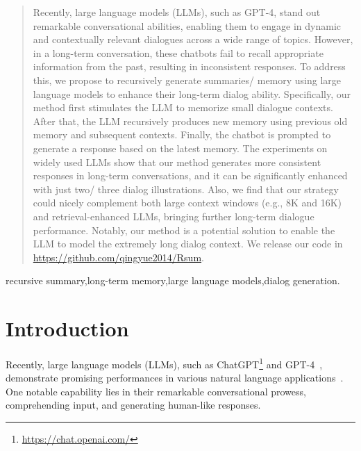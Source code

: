 \documentclass[authoryear,preprint,review,12pt]{elsarticle}
\begin{document}
\begin{frontmatter}
\begin{abstract}
Recently, large language models (LLMs), such as GPT-4, stand out remarkable conversational abilities, enabling them to engage in dynamic and contextually relevant dialogues across a wide range of topics. However, in a long-term conversation, these chatbots fail to recall appropriate information from the past, resulting in inconsistent responses. To address this, we propose to recursively generate summaries/ memory using large language models to enhance their long-term dialog ability. Specifically, our method first stimulates the LLM to memorize small dialogue contexts. After that, the LLM recursively produces new memory using previous old memory and subsequent
contexts. Finally, the chatbot is prompted to generate a response based on the latest memory. The experiments on widely used LLMs show that our method generates more consistent responses in long-term conversations, and it can be significantly enhanced with just two/ three dialog illustrations. Also, we find that our strategy could nicely complement both large context windows (e.g., 8K and 16K) and retrieval-enhanced LLMs, bringing further long-term dialogue performance. Notably, our method is a potential solution to enable the LLM to model the extremely long dialog context. We
release our code in \url{https://github.com/qingyue2014/Rsum}.
\end{abstract}



\begin{keyword}
recursive summary\sep long-term memory\sep large language models\sep dialog generation.
\end{keyword}

\end{frontmatter}



\section{Introduction}
Recently, large language models (LLMs), such as ChatGPT\footnote{\url{https://chat.openai.com/}} and GPT-4~\citep{GPT4OpenAI}, demonstrate promising performances in various natural language applications~\citep{Brown2020LanguageMA,Zeng2022GLM130BAO,zhong2023chat,Lu2023EAPrompt,Peng2023ChatGPT4MT,wu2023chatgpt}. One notable capability lies in their remarkable conversational prowess, comprehending input, and generating human-like responses. 
\end{document}
